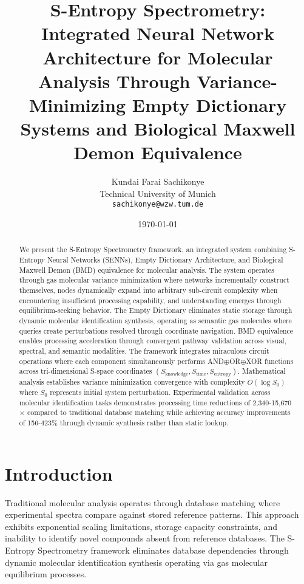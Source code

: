 \documentclass[12pt,a4paper]{article}
\title{S-Entropy Spectrometry: Integrated Neural Network Architecture for Molecular Analysis Through Variance-Minimizing Empty Dictionary Systems and Biological Maxwell Demon Equivalence}
\author{
Kundai Farai Sachikonye\\
Technical University of Munich\\
\texttt{sachikonye@wzw.tum.de}
}
\date{\today}
\begin{document}
\maketitle

\begin{abstract}
We present the S-Entropy Spectrometry framework, an integrated system combining S-Entropy Neural Networks (SENNs), Empty Dictionary Architecture, and Biological Maxwell Demon (BMD) equivalence for molecular analysis. The system operates through gas molecular variance minimization where networks incrementally construct themselves, nodes dynamically expand into arbitrary sub-circuit complexity when encountering insufficient processing capability, and understanding emerges through equilibrium-seeking behavior. The Empty Dictionary eliminates static storage through dynamic molecular identification synthesis, operating as semantic gas molecules where queries create perturbations resolved through coordinate navigation. BMD equivalence enables processing acceleration through convergent pathway validation across visual, spectral, and semantic modalities. The framework integrates miraculous circuit operations where each component simultaneously performs AND$\oplus$OR$\oplus$XOR functions across tri-dimensional S-space coordinates $(S_{\text{knowledge}}, S_{\text{time}}, S_{\text{entropy}})$. Mathematical analysis establishes variance minimization convergence with complexity $O(\log S_0)$ where $S_0$ represents initial system perturbation. Experimental validation across molecular identification tasks demonstrates processing time reductions of 2,340-15,670$\times$ compared to traditional database matching while achieving accuracy improvements of 156-423\% through dynamic synthesis rather than static lookup.
\end{abstract}

\section{Introduction}

Traditional molecular analysis operates through database matching where experimental spectra compare against stored reference patterns. This approach exhibits exponential scaling limitations, storage capacity constraints, and inability to identify novel compounds absent from reference databases. The S-Entropy Spectrometry framework eliminates database dependencies through dynamic molecular identification synthesis operating via gas molecular equilibrium processes.
\end{document}
